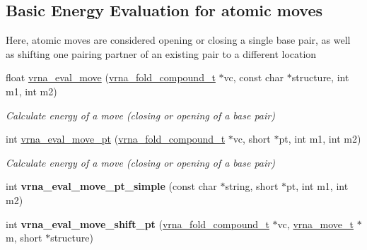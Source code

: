 \subsection*{Basic Energy Evaluation for atomic moves}
\label{_amgrp61b9b8bfaa6416ab6be391e8557e0eb1}%
Here, atomic moves are considered opening or closing a single base pair, as well as shifting one pairing partner of an existing pair to a different location \begin{DoxyCompactItemize}
\item 
float \hyperlink{group__eval_gaff1b9e4f4d17b434b0a822fe783672c1}{vrna\+\_\+eval\+\_\+move} (\hyperlink{group__fold__compound_ga1b0cef17fd40466cef5968eaeeff6166}{vrna\+\_\+fold\+\_\+compound\+\_\+t} $\ast$vc, const char $\ast$structure, int m1, int m2)
\begin{DoxyCompactList}\small\item\em Calculate energy of a move (closing or opening of a base pair) \end{DoxyCompactList}\item 
int \hyperlink{group__eval_ga123dabc119ea98c968a5e903cc46f0fb}{vrna\+\_\+eval\+\_\+move\+\_\+pt} (\hyperlink{group__fold__compound_ga1b0cef17fd40466cef5968eaeeff6166}{vrna\+\_\+fold\+\_\+compound\+\_\+t} $\ast$vc, short $\ast$pt, int m1, int m2)
\begin{DoxyCompactList}\small\item\em Calculate energy of a move (closing or opening of a base pair) \end{DoxyCompactList}\item 
\mbox{\label{group__eval_ga8bd14b548874366b8a2a9c65eff08888}} 
int {\bfseries vrna\+\_\+eval\+\_\+move\+\_\+pt\+\_\+simple} (const char $\ast$string, short $\ast$pt, int m1, int m2)
\item 
\mbox{\label{group__eval_gad8b0299608b6dd9f6e5554e939cdbbec}} 
int {\bfseries vrna\+\_\+eval\+\_\+move\+\_\+shift\+\_\+pt} (\hyperlink{group__fold__compound_ga1b0cef17fd40466cef5968eaeeff6166}{vrna\+\_\+fold\+\_\+compound\+\_\+t} $\ast$vc, \hyperlink{group__neighbors_structvrna__move__s}{vrna\+\_\+move\+\_\+t} $\ast$m, short $\ast$structure)
\end{DoxyCompactItemize}
